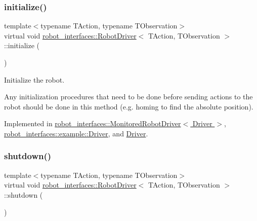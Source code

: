 \mbox{\label{classrobot__interfaces_1_1RobotDriver_af3cbef570a455e1f8085d701282264ff}} 
\subsubsection{\texorpdfstring{initialize()}{initialize()}}
{\footnotesize\ttfamily template$<$typename T\+Action, typename T\+Observation$>$ \\
virtual void \hyperlink{classrobot__interfaces_1_1RobotDriver}{robot\+\_\+interfaces\+::\+Robot\+Driver}$<$ T\+Action, T\+Observation $>$\+::initialize (\begin{DoxyParamCaption}{ }\end{DoxyParamCaption})\hspace{0.3cm}{\ttfamily [pure virtual]}}



Initialize the robot. 

Any initialization procedures that need to be done before sending actions to the robot should be done in this method (e.\+g. homing to find the absolute position). 

Implemented in \hyperlink{classrobot__interfaces_1_1MonitoredRobotDriver_a47b68c24afaa087e4e60e6413ab7ac89}{robot\+\_\+interfaces\+::\+Monitored\+Robot\+Driver$<$ Driver $>$}, \hyperlink{classrobot__interfaces_1_1example_1_1Driver_ab6f6c3f3ffb730d162bec70313f8aab7}{robot\+\_\+interfaces\+::example\+::\+Driver}, and \hyperlink{classDriver_a81c0beb523fad80cd40cfcc6a6e3de2d}{Driver}.

\mbox{\label{classrobot__interfaces_1_1RobotDriver_a3451fb8b15d2840b559f3ee858de01f8}} 
\subsubsection{\texorpdfstring{shutdown()}{shutdown()}}
{\footnotesize\ttfamily template$<$typename T\+Action, typename T\+Observation$>$ \\
virtual void \hyperlink{classrobot__interfaces_1_1RobotDriver}{robot\+\_\+interfaces\+::\+Robot\+Driver}$<$ T\+Action, T\+Observation $>$\+::shutdown (\begin{DoxyParamCaption}{ }\end{DoxyParamCaption})\hspace{0.3cm}{\ttfamily [pure virtual]}}




